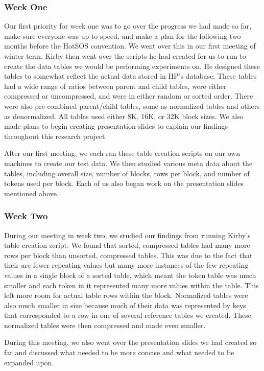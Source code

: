 \documentclass[10pt]{article}
\begin{document}
\subsubsection{Week One}
Our first priority for week one was to go over the progress we had made so far, make sure everyone was up to 
speed, and make a plan for the following two months before the HotSOS convention. We went over this in our first 
meeting of winter term. Kirby then went over the scripts he had created for us to run to create the data tables 
we would be performing experiments on. He designed these tables to somewhat reflect the actual data stored in 
HP's database. These tables had a wide range of ratios between parent and child tables, were either compressed 
or uncompressed, and were in either random or sorted order. There were also pre-combined parent/child tables, 
some as normalized tables and others as denormalized. All tables used either 8K, 16K, or 32K block sizes. We 
also made plans to begin creating presentation slides to explain our findings throughout this research project. 

After our first meeting, we each ran these table creation scripts on our own machines to create our test data. 
We then studied various meta data about the tables, including overall size, number of blocks, rows per block, and 
number of tokens used per block. Each of us also began work on the presentation slides mentioned above. 

\subsubsection{Week Two}
During our meeting in week two, we studied our findings from running Kirby's table creation script. We found 
that sorted, compressed tables had many more rows per block than unsorted, compressed tables. This was due to 
the fact that their are fewer repeating values but many more instances of the few repeating values in a single 
block of a sorted table, which meant the token table was much smaller and each token in it represented many more 
values within the table. This left more room for actual table rows within the block. Normalized tables were also 
much smaller in size because much of their data was represented by keys that corresponded to a row in one of 
several reference tables we created. These normalized tables were then compressed and made even smaller. 

During this meeting, we also went over the presentation slides we had created so far and discussed what needed 
to be more concise and what needed to be expanded upon. 
\end{document}
